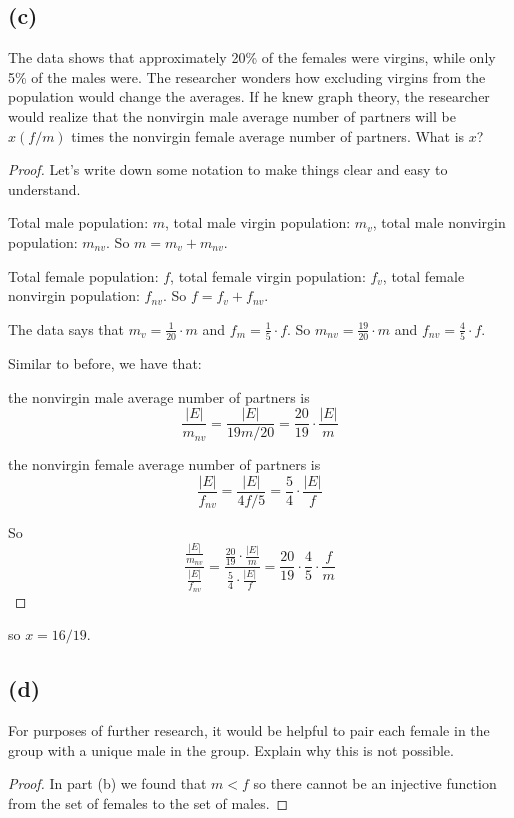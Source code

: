 \documentclass[14pt]{extarticle}
\begin{document}
\subsection{(c)}
The data shows that approximately 20\% of the females were virgins, while only 5\% of the males were. The researcher wonders how excluding virgins from the population would change the averages. If he knew graph theory, the researcher would realize that the nonvirgin male average number of partners will be $x(f/m)$ times the nonvirgin female average number of partners. What is $x$?
\begin{proof}
Let's write down some notation to make things clear and easy to understand.

Total male population: $m$, total male virgin population: $m_v$, total male nonvirgin population: $m_{nv}$. So $m = m_v + m_{nv}$.

Total female population: $f$, total female virgin population: $f_v$, total female nonvirgin population: $f_{nv}$. So $f = f_v + f_{nv}$.

The data says that $m_v = \frac{1}{20}\cdot m$ and $f_m = \frac{1}{5}\cdot f$. So $m_{nv} = \frac{19}{20}\cdot m$ and $f_{nv} = \frac{4}{5}\cdot f$.

Similar to before, we have that: 

the nonvirgin male average number of partners is 
$$
\frac{|E|}{m_{nv}} = \frac{|E|}{19m/20} = \frac{20}{19}\cdot\frac{|E|}{m}
$$

the nonvirgin female average number of partners is
$$
\frac{|E|}{f_{nv}} = \frac{|E|}{4f/5} = \frac{5}{4}\cdot\frac{|E|}{f}
$$

So 
$$
\displaystyle \frac{\displaystyle \frac{|E|}{m_{nv}}}{\displaystyle \frac{|E|}{f_{nv}}} = \frac{\displaystyle \frac{20}{19}\cdot\frac{|E|}{m}}{\displaystyle \frac{5}{4}\cdot\frac{|E|}{f}} = \frac{20}{19}\cdot\frac{4}{5}\cdot\frac{f}{m}
$$
\end{proof}

so $x = 16/19$.

\subsection{(d)}
For purposes of further research, it would be helpful to pair each female in the group with a unique male in the group. Explain why this is not possible.
\begin{proof}
In part (b) we found that $m < f$ so there cannot be an injective function from the set of females to the set of males.
\end{proof}
\end{document}
